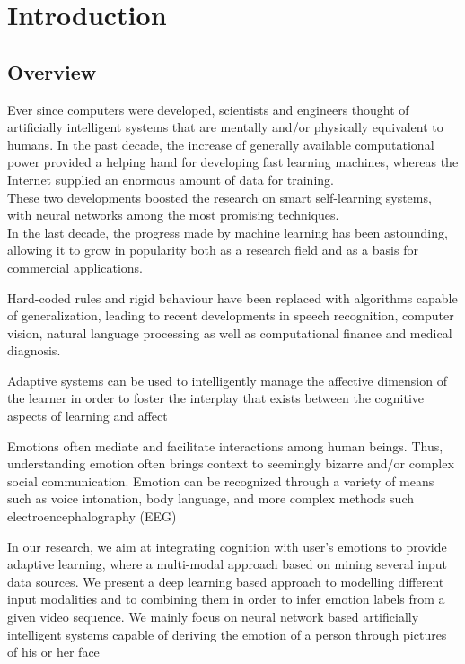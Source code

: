 \chapter{Introduction}
\section{Overview}
Ever since computers were developed, scientists and engineers thought of artificially intelligent systems that are mentally and/or physically equivalent to humans. In the past decade, the increase of generally available computational power provided a helping hand for developing fast learning machines, whereas the Internet supplied an enormous amount of data for training.\\ 
These two developments boosted the research on smart self-learning systems, with neural networks among the most promising techniques.\\
In the last decade, the progress made by machine learning has been astounding, allowing it to grow in popularity both as a research field and as a basis for commercial applications.

Hard-coded rules and rigid behaviour have been replaced with algorithms capable of generalization, leading to recent developments in speech recognition, computer vision, natural language processing as well as computational finance and medical diagnosis.

Adaptive systems can be used to intelligently manage the affective dimension of the learner in order to foster the interplay that exists between the cognitive aspects of learning and affect

Emotions often mediate and facilitate interactions among human beings. Thus, understanding emotion often brings context to seemingly bizarre and/or complex social communication. Emotion can be recognized through a variety of means such as voice intonation, body language, and more complex methods such electroencephalography (EEG)

In our research,  we aim at integrating cognition with user’s emotions to provide adaptive learning, where a multi-modal approach based on mining several input data sources. We present a deep learning based approach to modelling different input modalities and to combining them in order to infer emotion labels from a given video sequence. We mainly focus on neural network based artificially intelligent systems capable of deriving the emotion of a person through pictures of his or her face

